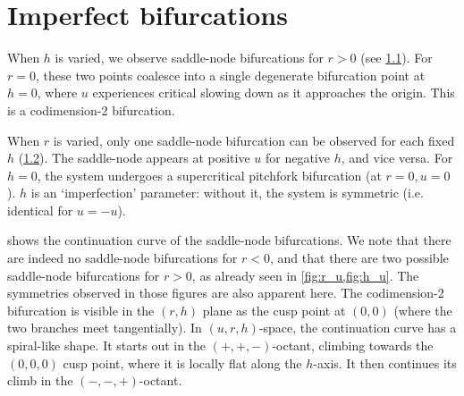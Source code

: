 \graphicspath{{../figures/2/}}


\chapter{Imperfect bifurcations}

When $h$ is varied, we observe saddle-node bifurcations for $r > 0$ (see \cref{fig:h_u}). For $r = 0$, these two points coalesce into a single degenerate bifurcation point at $h = 0$, where $u$ experiences critical slowing down as it approaches the origin. This is a codimension-2 bifurcation.

\begin{figure}
\label{fig:h_u}
\end{figure}

When $r$ is varied, only one saddle-node bifurcation can be observed for each fixed $h$ (\cref{fig:r_u}). The saddle-node appears at positive $u$ for negative $h$, and vice versa. For $h = 0$, the system undergoes a supercritical pitchfork bifurcation (at $r = 0, u = 0$). $h$ is an `imperfection' parameter: without it, the system is symmetric (i.e. identical for $u = -u$).

\begin{figure}
\label{fig:r_u}
\end{figure}


 shows the continuation curve of the saddle-node bifurcations. We note that there are indeed no saddle-node bifurcations for $r < 0$, and that there are two possible saddle-node bifurcations for $r > 0$, as already seen in \cref{fig:r_u,fig:h_u}. The symmetries observed in those figures are also apparent here. The codimension-2 bifurcation is visible in the $(r,h)$ plane as the cusp point at $(0,0)$ (where the two branches meet tangentially). In $(u,r,h)$-space, the continuation curve has a spiral-like shape. It starts out in the $(+,+,-)$-octant, climbing towards the $(0,0,0)$ cusp point, where it is locally flat along the $h$-axis. It then continues its climb in the $(-,-,+)$-octant.

